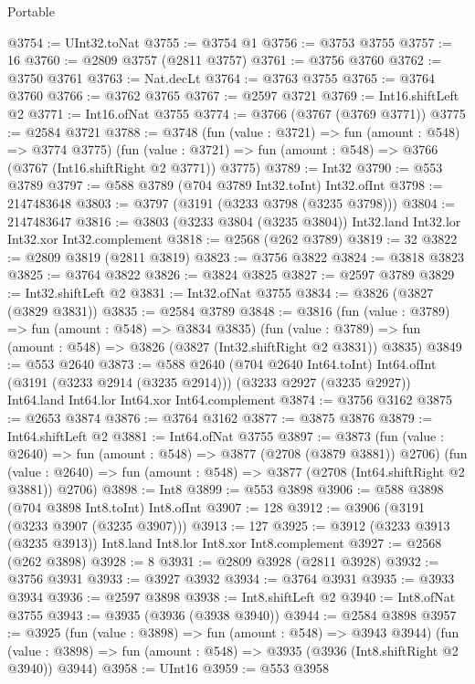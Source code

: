 \begin{lexlean}{Portable}
\begin{coremodule}
@3754 := UInt32.toNat
@3755 := @3754 @1
@3756 := @3753 @3755
@3757 := 16
@3760 := @2809 @3757 (@2811 @3757)
@3761 := @3756 @3760
@3762 := @3750 @3761
@3763 := Nat.decLt
@3764 := @3763 @3755
@3765 := @3764 @3760
@3766 := @3762 @3765
@3767 := @2597 @3721
@3769 := Int16.shiftLeft @2
@3771 := Int16.ofNat @3755
@3774 := @3766 (@3767 (@3769 @3771))
@3775 := @2584 @3721
@3788 := @3748
    (fun (value : @3721) => fun (amount : @548) => @3774 @3775)
    (fun (value : @3721) => fun (amount : @548) => @3766 (@3767 (Int16.shiftRight @2 @3771)) @3775)
@3789 := Int32
@3790 := @553 @3789
@3797 := @588 @3789 (@704 @3789 Int32.toInt) Int32.ofInt
@3798 := 2147483648
@3803 := @3797 (@3191 (@3233 @3798 (@3235 @3798)))
@3804 := 2147483647
@3816 := @3803 (@3233 @3804 (@3235 @3804)) Int32.land Int32.lor Int32.xor Int32.complement
@3818 := @2568 (@262 @3789)
@3819 := 32
@3822 := @2809 @3819 (@2811 @3819)
@3823 := @3756 @3822
@3824 := @3818 @3823
@3825 := @3764 @3822
@3826 := @3824 @3825
@3827 := @2597 @3789
@3829 := Int32.shiftLeft @2
@3831 := Int32.ofNat @3755
@3834 := @3826 (@3827 (@3829 @3831))
@3835 := @2584 @3789
@3848 := @3816
    (fun (value : @3789) => fun (amount : @548) => @3834 @3835)
    (fun (value : @3789) => fun (amount : @548) => @3826 (@3827 (Int32.shiftRight @2 @3831)) @3835)
@3849 := @553 @2640
@3873 := @588
    @2640
    (@704 @2640 Int64.toInt)
    Int64.ofInt
    (@3191 (@3233 @2914 (@3235 @2914)))
    (@3233 @2927 (@3235 @2927))
    Int64.land
    Int64.lor
    Int64.xor
    Int64.complement
@3874 := @3756 @3162
@3875 := @2653 @3874
@3876 := @3764 @3162
@3877 := @3875 @3876
@3879 := Int64.shiftLeft @2
@3881 := Int64.ofNat @3755
@3897 := @3873
    (fun (value : @2640) => fun (amount : @548) => @3877 (@2708 (@3879 @3881)) @2706)
    (fun (value : @2640) => fun (amount : @548) => @3877 (@2708 (Int64.shiftRight @2 @3881)) @2706)
@3898 := Int8
@3899 := @553 @3898
@3906 := @588 @3898 (@704 @3898 Int8.toInt) Int8.ofInt
@3907 := 128
@3912 := @3906 (@3191 (@3233 @3907 (@3235 @3907)))
@3913 := 127
@3925 := @3912 (@3233 @3913 (@3235 @3913)) Int8.land Int8.lor Int8.xor Int8.complement
@3927 := @2568 (@262 @3898)
@3928 := 8
@3931 := @2809 @3928 (@2811 @3928)
@3932 := @3756 @3931
@3933 := @3927 @3932
@3934 := @3764 @3931
@3935 := @3933 @3934
@3936 := @2597 @3898
@3938 := Int8.shiftLeft @2
@3940 := Int8.ofNat @3755
@3943 := @3935 (@3936 (@3938 @3940))
@3944 := @2584 @3898
@3957 := @3925
    (fun (value : @3898) => fun (amount : @548) => @3943 @3944)
    (fun (value : @3898) => fun (amount : @548) => @3935 (@3936 (Int8.shiftRight @2 @3940)) @3944)
@3958 := UInt16
@3959 := @553 @3958

\end{coremodule}
\end{lexlean}
